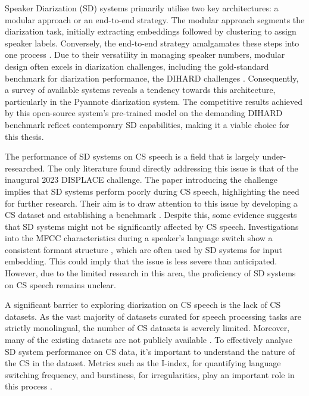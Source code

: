 \documentclass[11pt, a4paper]{report}
\begin{document}
Speaker Diarization (SD) systems primarily utilise two key architectures: a
modular approach or an end-to-end strategy. The modular approach segments 
the diarization task, initially extracting embeddings followed by 
clustering to assign speaker labels. Conversely, the end-to-end strategy 
amalgamates these steps into one process \cite{parkReviewSpeakerDiarization2021}. 
Due to their versatility in managing speaker numbers, modular design often excels 
in diarization challenges, including the gold-standard benchmark for diarization 
performance, the DIHARD challenges \cite{heoNAVERCLOVASUBMISSION}. 
Consequently, a survey of available systems reveals a tendency towards this architecture, 
particularly in the Pyannote diarization system. The competitive results achieved by 
this open-source system's pre-trained model on the demanding DIHARD benchmark 
\cite{PyannoteSpeakerdiarizationHugging2023} reflect contemporary SD capabilities, 
making it a viable choice for this thesis.

\vspace*{10pt}
The performance of SD systems on CS speech is a field that is largely under-researched.
The only literature found directly addressing this issue is that of the inaugural 
2023 DISPLACE challenge. The paper introducing the challenge implies that SD systems 
perform poorly during CS speech, highlighting the need for further research. Their 
aim is to draw attention to this issue by developing a CS dataset and establishing a benchmark 
\cite{baghelDISPLACEChallengeDIarization2023b}.
Despite this, some evidence suggests that SD systems might not be significantly 
affected by CS speech. Investigations into the MFCC characteristics during a speaker's language 
switch show a consistent formant structure \cite{mishraChallengesSpokenLanguage2023}, 
which are often used by SD systems for input embedding. This could imply that the issue 
is less severe than anticipated. However, due to the limited research in this area, the 
proficiency of SD systems on CS speech remains unclear.

\vspace*{10pt}
A significant barrier to exploring diarization on CS speech is the lack of CS datasets. 
As the vast majority of datasets curated for speech processing tasks are strictly 
monolingual, the number of CS datasets is severely limited. Moreover, many of the 
existing datasets are not publicly available \cite[9]{sitaramSurveyCodeswitchedSpeech2020}.
To effectively analyse SD system performance on CS data, it's important to understand 
the nature of the CS in the dataset. Metrics such as the I-index, for quantifying 
language switching frequency, and burstiness, for irregularities, play an important 
role in this process \cite{guzmanMetricsModelingCodeSwitching2017}.
\end{document}
